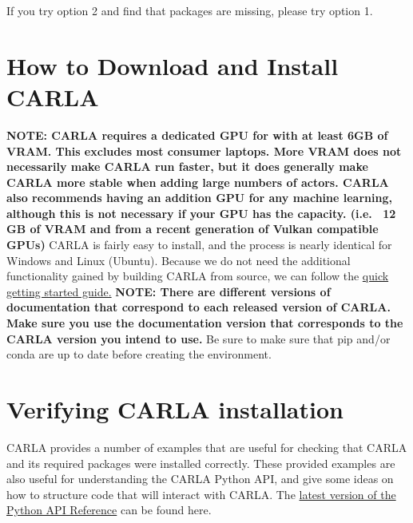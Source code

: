 \documentclass[12pt,oneside,letterpaper]{article}
\begin{document}
If you try option 2 and find that packages are missing, please try option 1.

\section{How to Download and Install CARLA}
\label{sec:CARLAInstall}
\textbf{NOTE: CARLA requires a dedicated GPU for with at least 6GB of VRAM. This excludes most consumer laptops. More VRAM does not necessarily make CARLA run faster, but it does generally make CARLA more stable when adding large numbers of actors. CARLA also recommends having an addition GPU for any machine learning, although this is not necessary if your GPU has the capacity. (i.e. ~12 GB of VRAM and from a recent generation of Vulkan compatible GPUs)}
CARLA is fairly easy to install, and the process is nearly identical for Windows and Linux (Ubuntu). Because we do not need the additional functionality gained by building CARLA from source, we can follow the \href{https://carla.readthedocs.io/en/latest/start_quickstart/}{quick getting started guide.} \textbf{NOTE: There are different versions of documentation that correspond to each released version of CARLA. Make sure you use the documentation version that corresponds to the CARLA version you intend to use.} Be sure to make sure that pip and/or conda are up to date before creating the environment. \\


\section{Verifying CARLA installation}
\label{sec:verifyInstall}
CARLA provides a number of examples that are useful for checking that CARLA and its required packages were installed correctly. These provided examples are also useful for understanding the CARLA Python API, and give some ideas on how to structure code that will interact with CARLA. The \href{https://carla.readthedocs.io/en/latest/python_api/}{latest version of the Python API Reference} can be found here. 
\end{document}
